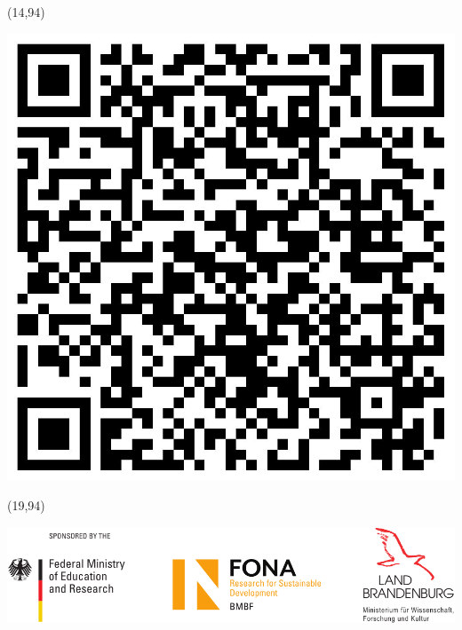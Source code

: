 \documentclass[20pt]{beamer}
\begin{document}
\begin{frame}
        \begin{textblock}{5}(14,94)
            \begin{ClearBox}
                \begin{block}{}
                    \centering
                    \includegraphics[scale=0.25]{img/qrcode_IASS}
                \end{block}
            \end{ClearBox}
        \end{textblock}

        \begin{textblock}{11}(19,94)
            \begin{WhiteBox}
                \vspace{-1cm}
                \begin{block}{}
                    \includegraphics[width=\textwidth]{img/Sponsor_logos}
                \end{block}
            \end{WhiteBox}
        \end{textblock}
    \end{frame}
\end{document}
